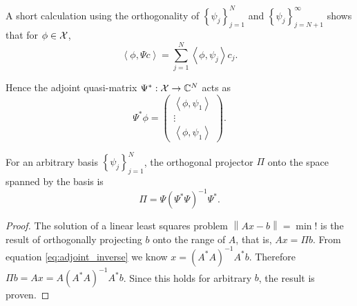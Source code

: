 A short calculation using the orthogonality of $\left\{ \psi_j \right\}_{j=1}^N$ and 
$\left\{ \psi_j \right\}_{j=N+1}^\infty$ shows that for $\phi \in \mathcal{X}$, 
\begin{equation}
    \left\langle \phi, \Psi c \right\rangle 
    = \sum_{j=1}^{N} \left\langle \phi, \psi_j \right\rangle c_j . 
\end{equation}
\iffalse
Let $\phi = \sum_{i=1}^{\infty} b_i \psi_i$ and observe
\begin{align}
    \left\langle \phi, \Psi c \right\rangle
    &= \sum_{i=1}^{\infty} \sum_{j=1}^{N} b_i c_j \left\langle \psi_i, \psi_j \right\rangle \\
    &= \sum_{i=1}^{N} \sum_{j=1}^{N} b_i c_j \left\langle \psi_i, \psi_j \right\rangle \\
    &= \sum_{j=1}^{N} \left\langle \sum_{i=1}^{N} b_i \psi_i, \psi_j \right\rangle c_j \\
    &= \sum_{j=1}^{N} \left\langle \sum_{i=1}^{\infty} b_i \psi_i, \psi_j \right\rangle c_j \\
    &= \sum_{j=1}^{N} \left\langle \phi, \psi_j \right\rangle c_j . 
\end{align}
\fi
Hence the adjoint quasi-matrix $\Psi^* : \mathcal{X} \to \mathbb{C}^N$ acts as 
\begin{equation}
    \label{eq:Psi_star}
    \Psi^* \phi = \begin{pmatrix}
        \left\langle \phi, \psi_1 \right\rangle \\
        \vdots \\
        \left\langle \phi, \psi_1 \right\rangle
    \end{pmatrix} . 
\end{equation}

\begin{lemma}
    For an arbitrary basis $\left\{ \psi_j \right\}_{j=1}^N$, the orthogonal projector $\Pi$ 
    onto the space spanned by the basis is 
    \begin{equation}
        \Pi = \Psi (\Psi^* \Psi)^{-1} \Psi^* . 
    \end{equation}
\end{lemma}

\begin{proof}
    The solution of a linear least squares problem $\left\| Ax - b \right\| = \min !$ is 
    the result of orthogonally projecting $b$ onto the range of $A$, that is, $A x = \Pi b$. 
    From equation \ref{eq:adjoint_inverse} we know $x = (A^* A)^{-1} A^* b$. Therefore 
    $\Pi b = A x = A (A^* A)^{-1} A^* b$. Since this holds for arbitrary $b$, the result 
    is proven. 
\end{proof}

